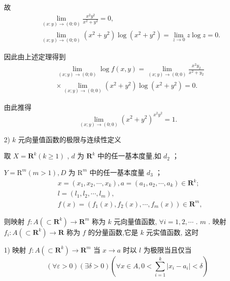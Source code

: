 故
\begin{align*}
	&\mathop{\lim }\limits_{{\left( {x : y}\right)  \rightarrow  \left( {0 : 0}\right) }}\frac{{x}^{2}{y}^{2}}{{x}^{2} + {y}^{2}} = 0,\\
	&\mathop{\lim }\limits_{{\left( {x;y}\right)  \rightarrow  \left( {0;0}\right) }}\left( {{x}^{2} + {y}^{2}}\right) \log \left( {{x}^{2} + {y}^{2}}\right)  = \mathop{\lim }\limits_{{z \rightarrow  0}}z\log z = 0.
\end{align*}

因此由上述定理得到
\begin{align*}
	&\mathop{\lim }\limits_{{\left( {x;y}\right)  \rightarrow  \left( {0;0}\right) }}\log f\left( {x,y}\right)  = \mathop{\lim }\limits_{{\left( {x;y}\right)  \rightarrow  \left( {0;0}\right) }}\frac{{x}^{2}{y}_{2}}{{x}^{2} + {y}_{2}}\\
	&\times  \mathop{\lim }\limits_{{\left( {x;y}\right)  \rightarrow  \left( {0;0}\right) }}\left( {{x}^{2} + {y}^{2}}\right) \log \left( {{x}^{2} + {y}^{2}}\right)  = 0.
\end{align*}

由此推得
$$\mathop{\lim }\limits_{{\left( {x;y}\right)  \rightarrow  \left( {0;0}\right) }}{\left( {x}^{2} + {y}^{2}\right) }^{{x}^{2}{y}^{2}} = 1.$$

2) $k$ 元向量值函数的极限与连续性定义

取 $X = {\mathbf{R}}^{k}\left( {k \geq  1}\right)$ , $d$ 为 ${\mathbf{R}}^{k}$ 中的任一基本度量,如 ${d}_{2}$ ；

$Y = {\mathrm{R}}^{m}\left( {m > 1}\right) ,D$ 为 ${\mathrm{R}}^{m}$ 中的任一基本度量 ${d}_{3}$ ；
\begin{align*}
	&x = \left( {{x}_{1},{x}_{2},\cdots ,{x}_{k}}\right) ,a = \left( {{a}_{1},{a}_{2},\cdots ,{a}_{k}}\right)  \in  {\mathbf{R}}^{k};\\
	&l = \left( {{l}_{1},{l}_{2},\cdots ,{l}_{m}}\right) ,\\
	&f\left( x\right)  = \left( {{f}_{1}\left( x\right) ,{f}_{2}\left( x\right) ,\cdots ,{f}_{m}\left( x\right) }\right)  \in  {\mathbf{R}}^{m},
\end{align*}

则映射 $f : A\left( { \subset  {\mathbf{R}}^{k}}\right)  \rightarrow  {\mathbf{R}}^{m}$ 称为 $k$ 元向量值函数, $\forall i = 1,2,\cdots$ . $m$ . 映射 ${f}_{i} : A\left( { \subset  {\mathbf{R}}^{k}}\right)  \rightarrow  \mathbf{R}$ 称为 $f$ 的分量函数,它是 $k$ 元实值函数, 这时

1) 映射 $f : A\left( { \subset  {\mathbf{R}}^{k}}\right)  \rightarrow  {\mathbf{R}}^{m}$ 当 $x \rightarrow  a$ 时以 $l$ 为极限当且仅当
$$\left( {\forall \varepsilon  > 0}\right) \left( {\exists \delta  > 0}\right) \left( {\forall x \in  A,0 < \mathop{\sum }\limits_{{i = 1}}^{k}\left| {{x}_{i} - {a}_{i}}\right|  < \delta }\right)$$

